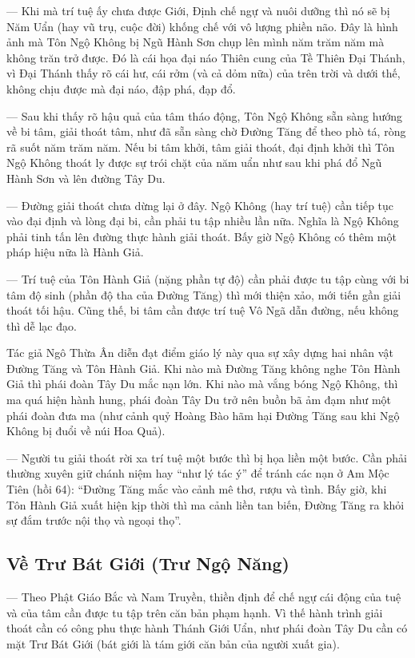 — Khi mà trí tuệ ấy chưa được Giới, Định chế ngự và nuôi dưỡng thì nó sẽ bị Năm Uẩn (hay vũ trụ, cuộc đời) khống chế với vô lượng phiền não. Đây là hình ảnh mà Tôn Ngộ Không bị Ngũ Hành Sơn chụp lên mình năm trăm năm mà không trăn trở được. Đó là cái họa đại náo Thiên cung của Tề Thiên Đại Thánh, vì Đại Thánh thấy rõ cái hư, cái rởm (và cả dỏm nữa) của trên trời và dưới thế, không chịu được mà đại náo, đập phá, đạp đổ.

— Sau khi thấy rõ hậu quả của tâm tháo động, Tôn Ngộ Không sẵn sàng hướng về bi tâm, giải thoát tâm, như đã sẵn sàng chờ Đường Tăng để theo phò tá, ròng rã suốt năm trăm năm. Nếu bi tâm khởi, tâm giải thoát, đại định khởi thì Tôn Ngộ Không thoát ly được sự trói chặt của năm uẩn như sau khi phá đổ Ngũ Hành Sơn và lên đường Tây Du.

— Đường giải thoát chưa dừng lại ở đây. Ngộ Không (hay trí tuệ) cần tiếp tục vào đại định và lòng đại bi, cần phải tu tập nhiều lần nữa. Nghĩa là Ngộ Không phải tinh tấn lên đường thực hành giải thoát. Bấy giờ Ngộ Không có thêm một pháp hiệu nữa là Hành Giả.

— Trí tuệ của Tôn Hành Giả (nặng phần tự độ) cần phải được tu tập cùng với bi tâm độ sinh (phần độ tha của Đường Tăng) thì mới thiện xảo, mới tiến gần giải thoát tối hậu. Cũng thế, bi tâm cần được trí tuệ Vô Ngã dẫn đường, nếu không thì dễ lạc đạo.

Tác giả Ngô Thừa Ân diễn đạt điểm giáo lý này qua sự xây dựng hai nhân vật Đường Tăng và Tôn Hành Giả. Khi nào mà Đường Tăng không nghe Tôn Hành Giả thì phái đoàn Tây Du mắc nạn lớn. Khi nào mà vắng bóng Ngộ Không, thì ma quá hiện hành hung, phái đoàn Tây Du trở nên  buồn bã ảm đạm như một phái đoàn đưa ma (như cảnh quỷ Hoàng Bào hãm hại Đường Tăng sau khi Ngộ Không bị đuổi về núi Hoa Quả).

— Người tu giải thoát rời xa trí tuệ một bước thì bị họa liền một bước. Cần phải thường xuyên giữ chánh niệm hay ``như lý tác ý'' để tránh các nạn ở Am Mộc Tiên (hồi 64): ``Đường Tăng mắc vào cảnh mê thơ, rượu và tình. Bấy giờ, khi Tôn Hành Giả xuất hiện kịp thời thì ma cảnh liền tan biến, Đường Tăng ra khỏi sự đắm trước nội thọ và ngoại thọ''.

\subsection{Về Trư Bát Giới (Trư Ngộ Năng)} %
\label{sub:ve_tru_bat_gioi}

— Theo Phật Giáo Bắc và Nam Truyền, thiền định để chế ngự cái động của tuệ và của tâm cần được tu tập trên căn bản phạm hạnh. Vì thế hành trình giải thoát cần có công phu thực hành Thánh Giới Uẩn, như phái đoàn Tây Du cần có mặt Trư Bát Giới (bát giới là tám giới căn bản của người xuất gia).

